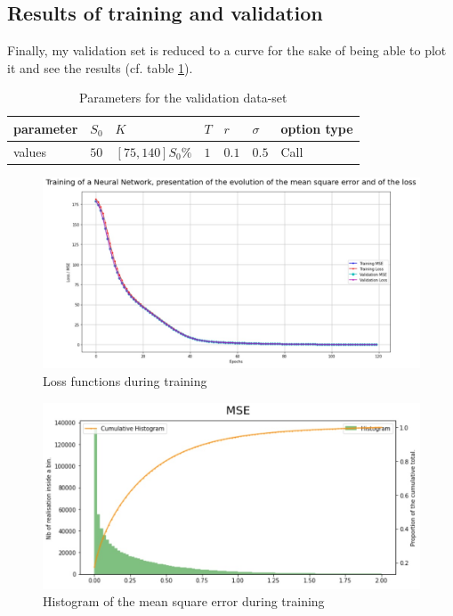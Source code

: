\subsection{Results of training and validation}

Finally, my validation set is reduced to a curve for the sake of being able to plot it and see the results (cf. table \ref{table:validation_ANN}). 


\begin{table}
\centering
\begin{tabular}{  | m{2.5cm} | m{1.3 cm} | m{2 cm}| m{1.5 cm} |  m{1.2 cm} | m{1.2 cm}| m{2.4 cm} |  } 
\hline
parameter & $S_0$ &  $K$ & $T$ & $r$ & $\sigma$ & option type   \\ 
\hline
values &$50$ & $[75,140] S_0 \% $ & $1$ & $0.1$ & $0.5$ & Call  \\
\hline
\end{tabular}
\caption{Parameters for the validation data-set}
\label{table:validation_ANN}
\end{table}









\begin{figure}
\centering
\includegraphics[width = 0.8 \textwidth]{../addition_part/images/NN/loss_function.jpg}
\caption{Loss functions during training}
\label{im:loss_function}

\end{figure}




\begin{figure}
\centering
\includegraphics[width = 12cm]{../addition_part/images/NN/MSE.jpg}
\caption{Histogram of the mean square error during training}
\label{im:MSE}
\end{figure}







